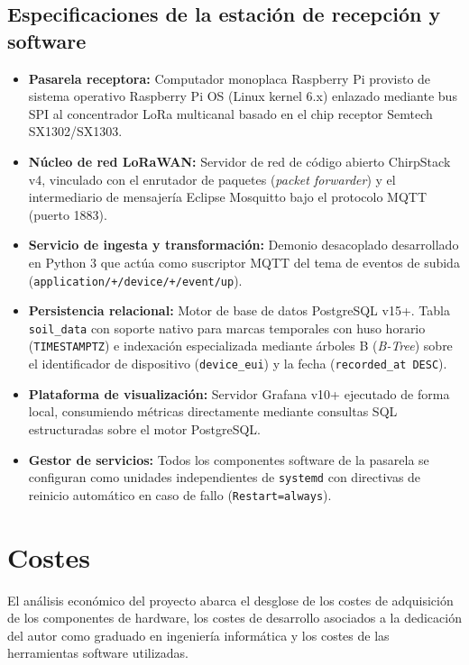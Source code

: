 \subsection{Especificaciones de la estación de recepción y software}
\begin{itemize}
    \item \textbf{Pasarela receptora:} Computador monoplaca Raspberry Pi provisto de sistema operativo Raspberry Pi OS (Linux kernel 6.x) enlazado mediante bus SPI al concentrador LoRa multicanal basado en el chip receptor Semtech SX1302/SX1303.
    \item \textbf{Núcleo de red LoRaWAN:} Servidor de red de código abierto ChirpStack v4, vinculado con el enrutador de paquetes (\textit{packet forwarder}) y el intermediario de mensajería Eclipse Mosquitto bajo el protocolo MQTT (puerto 1883).
    \item \textbf{Servicio de ingesta y transformación:} Demonio desacoplado desarrollado en Python 3 que actúa como suscriptor MQTT del tema de eventos de subida (\texttt{application/+/device/+/event/up}).
    \item \textbf{Persistencia relacional:} Motor de base de datos PostgreSQL v15+. Tabla \texttt{soil\_data} con soporte nativo para marcas temporales con huso horario (\texttt{TIMESTAMPTZ}) e indexación especializada mediante árboles B (\textit{B-Tree}) sobre el identificador de dispositivo (\texttt{device\_eui}) y la fecha (\texttt{recorded\_at DESC}).
    \item \textbf{Plataforma de visualización:} Servidor Grafana v10+ ejecutado de forma local, consumiendo métricas directamente mediante consultas SQL estructuradas sobre el motor PostgreSQL.
    \item \textbf{Gestor de servicios:} Todos los componentes software de la pasarela se configuran como unidades independientes de \texttt{systemd} con directivas de reinicio automático en caso de fallo (\texttt{Restart=always}).
\end{itemize}


\section{Costes}

El análisis económico del proyecto abarca el desglose de los costes de adquisición de los componentes de hardware, los costes de desarrollo asociados a la dedicación del autor como graduado en ingeniería informática y los costes de las herramientas software utilizadas.


